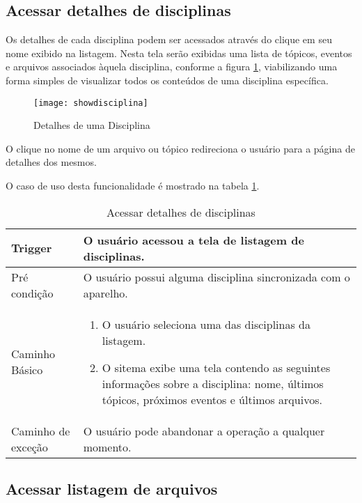 \subsection{Acessar detalhes de disciplinas}

Os detalhes de cada disciplina podem ser acessados através do clique em seu nome exibido na listagem. Nesta tela serão exibidas uma lista de tópicos, eventos e arquivos associados àquela disciplina, conforme a figura \ref{showdisciplina}, viabilizando uma forma simples de visualizar todos os conteúdos de uma disciplina específica.

\begin{figure}[H]
    \centering
\texttt{[image: showdisciplina]}
    \caption{Detalhes de uma Disciplina}
    \label{showdisciplina}
\end{figure}

O clique no nome de um arquivo ou tópico redireciona o usuário para a página de detalhes dos mesmos.

O caso de uso desta funcionalidade é mostrado na tabela \ref{table:showdisciplina}.

\begin{table}[H]
  \begin{tabular}{ p{} | p{} }
    Trigger & O usuário acessou a tela de listagem de disciplinas.\\
    \hline
    Pré condição & O usuário possui alguma disciplina sincronizada com o aparelho.\\
    \hline
    Caminho Básico &
    \begin{minipage}{5in}
      \vskip 4pt
      \begin{enumerate}
        \item O usuário seleciona uma das disciplinas da listagem.
        \item O sitema exibe uma tela contendo as seguintes informações sobre a disciplina: nome, últimos tópicos, próximos eventos e últimos arquivos.
      \end{enumerate}
      \vskip 4pt
    \end{minipage} \\
    \hline
    Caminho de exceção & O usuário pode abandonar a operação a qualquer momento.
  \end{tabular}
  \caption{Acessar detalhes de disciplinas}
  \label{table:showdisciplina}
\end{table}

\subsection{Acessar listagem de arquivos}

